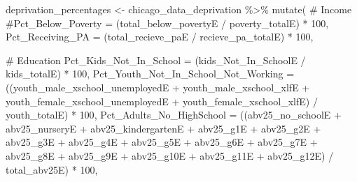 \documentclass[
  letterpaper,
  DIV=11,
  numbers=noendperiod]{scrreprt}
\newenvironment{Shaded}{\begin{snugshade}}{\end{snugshade}}
\newcommand{\AttributeTok}[1]{\textcolor[rgb]{0.40,0.45,0.13}{#1}}
\newcommand{\CommentTok}[1]{\textcolor[rgb]{0.37,0.37,0.37}{#1}}
\newcommand{\DecValTok}[1]{\textcolor[rgb]{0.68,0.00,0.00}{#1}}
\newcommand{\FunctionTok}[1]{\textcolor[rgb]{0.28,0.35,0.67}{#1}}
\newcommand{\NormalTok}[1]{\textcolor[rgb]{0.00,0.23,0.31}{#1}}
\newcommand{\OtherTok}[1]{\textcolor[rgb]{0.00,0.23,0.31}{#1}}
\newcommand{\SpecialCharTok}[1]{\textcolor[rgb]{0.37,0.37,0.37}{#1}}
\begin{document}
\begin{Shaded}
\begin{Highlighting}[]
\NormalTok{deprivation\_percentages }\OtherTok{\textless{}{-}}\NormalTok{ chicago\_data\_deprivation }\SpecialCharTok{\%\textgreater{}\%}
  \FunctionTok{mutate}\NormalTok{(}
    \CommentTok{\# Income}
    \CommentTok{\#Pct\_Below\_Poverty = (total\_below\_povertyE / poverty\_totalE) * 100,}
    \AttributeTok{Pct\_Receiving\_PA =}\NormalTok{ (total\_recieve\_paE }\SpecialCharTok{/}\NormalTok{ recieve\_pa\_totalE) }\SpecialCharTok{*} \DecValTok{100}\NormalTok{,}
    
    \CommentTok{\# Education}
    \AttributeTok{Pct\_Kids\_Not\_In\_School =}\NormalTok{ (kids\_Not\_In\_SchoolE }\SpecialCharTok{/}\NormalTok{ kids\_totalE) }\SpecialCharTok{*} \DecValTok{100}\NormalTok{,}
    \AttributeTok{Pct\_Youth\_Not\_In\_School\_Not\_Working =}\NormalTok{ ((youth\_male\_xschool\_unemployedE }\SpecialCharTok{+}\NormalTok{ youth\_male\_xschool\_xlfE }\SpecialCharTok{+} 
\NormalTok{                                            youth\_female\_xschool\_unemployedE }\SpecialCharTok{+}\NormalTok{ youth\_female\_xschool\_xlfE) }\SpecialCharTok{/}\NormalTok{ youth\_totalE) }\SpecialCharTok{*} \DecValTok{100}\NormalTok{,}
    \AttributeTok{Pct\_Adults\_No\_HighSchool =}\NormalTok{ ((abv25\_no\_schoolE }\SpecialCharTok{+}\NormalTok{ abv25\_nurseryE }\SpecialCharTok{+}\NormalTok{ abv25\_kindergartenE }\SpecialCharTok{+}\NormalTok{ abv25\_g1E }\SpecialCharTok{+} 
\NormalTok{                                 abv25\_g2E }\SpecialCharTok{+}\NormalTok{ abv25\_g3E }\SpecialCharTok{+}\NormalTok{ abv25\_g4E }\SpecialCharTok{+}\NormalTok{ abv25\_g5E }\SpecialCharTok{+}\NormalTok{ abv25\_g6E }\SpecialCharTok{+} 
\NormalTok{                                 abv25\_g7E }\SpecialCharTok{+}\NormalTok{ abv25\_g8E }\SpecialCharTok{+}\NormalTok{ abv25\_g9E }\SpecialCharTok{+}\NormalTok{ abv25\_g10E }\SpecialCharTok{+}\NormalTok{ abv25\_g11E }\SpecialCharTok{+} 
\NormalTok{                                 abv25\_g12E) }\SpecialCharTok{/}\NormalTok{ total\_abv25E) }\SpecialCharTok{*} \DecValTok{100}\NormalTok{,}
    

\end{Highlighting}
\end{Shaded}
\end{document}

